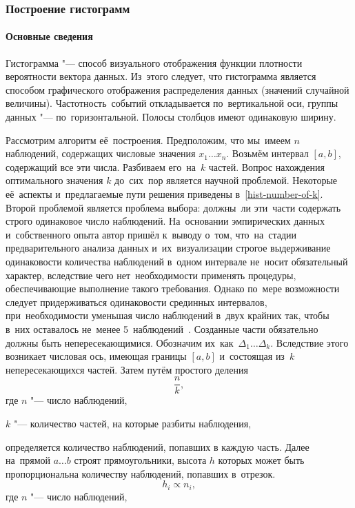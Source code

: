 \documentclass[]{scrartcl}
\begin{document}
\subsubsection{Построение гистограмм}
\paragraph{Основные сведения}
\par
Гистограмма "--- способ визуального отображения функции плотности вероятности вектора данных. Из~этого следует, что гистограмма является способом графического отображения распределения данных (значений случайной величины). Частотность~событий откладывается по~вертикальной оси, группы данных "--- по~горизонтальной. Полосы столбцов имеют одинаковую ширину.
\par 
Рассмотрим алгоритм её~построения. Предположим, что мы~имеем $n$ наблюдений, содержащих числовые значения $x_{1}\ldots x_{n}$. Возьмём интервал $[a, b]$, содержащий все эти числа. Разбиваем его~на~$k$ частей. Вопрос нахождения оптимального значения $k$ до~сих~пор является научной проблемой. Некоторые её~аспекты и~предлагаемые пути решения приведены в~\ref{hist-number-of-k}. Второй проблемой является проблема выбора: должны~ли эти~части содержать строго одинаковое число наблюдений. На~основании эмпирических данных и~собственного опыта автор пришёл к~выводу о~том, что~на~стадии предварительного анализа данных и~их~визуализации строгое выдерживание одинаковости количества наблюдений в~одном интервале не~носит обязательный характер, вследствие чего нет~необходимости применять процедуры, обеспечивающие выполнение такого требования. Однако по~мере возможности следует придерживаться одинаковости срединных интервалов, при~необходимости уменьшая число наблюдений в~двух крайних так, чтобы в~них оставалось не~менее 5~наблюдений~\cite{Nowiczkij:oczenka-pogresh}. Созданные части обязательно должны быть непересекающимися. Обозначим их~как~$\Delta_{1}\ldots \Delta_{k}$. Вследствие этого возникает числовая ось, имеющая границы $[a, b]$ и~состоящая из~$k$ непересекающихся частей. Затем путём простого деления
\begin{equation}\label{hist-simple}
\frac{n}{k},
\end{equation}
где $n$ "--- число наблюдений,

$k$ "--- количество частей, на которые разбиты наблюдения,
\par
определяется количество наблюдений, попавших в каждую часть. Далее на~прямой $a\ldots b$ строят прямоугольники, высота $h$ которых может быть пропорциональна количеству наблюдений, попавших в~отрезок.
\begin{equation}\label{eq:hist-simple-prop}
h_{i} \propto n_{i},
\end{equation}
где $n$ "--- число наблюдений,
\end{document}
